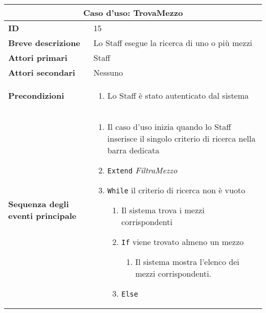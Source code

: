 \documentclass[a4paper]{report}
\begin{document}
\clearpage
\begin{table}[H]
\vspace*{-0cm}
\renewcommand{\arraystretch}{1.9}
\begin{tabular}{|p{3.9cm}|p{9.9cm}|}
\hline
\multicolumn{2}{|c|}{\textbf{Caso d’uso: TrovaMezzo}} \\ \hline
        \textbf{ID} & 15 \\ \hline
        \textbf{Breve descrizione} & Lo Staff esegue la ricerca di uno o più mezzi \\ \hline
	\textbf{Attori primari} & Staff \\ \hline
	\textbf{Attori secondari} & Nessuno \\ \hline
	\textbf{Precondizioni} & \begin{enumerate}[label=\arabic*.,leftmargin=14pt,labelsep=0.5em,topsep=0pt,partopsep=0pt,parsep=0pt,itemsep=0pt]
        \item Lo Staff è stato autenticato dal sistema
    \end{enumerate} \\ \hline
	\textbf{Sequenza degli eventi principale} & 
\begin{enumerate}[leftmargin=14pt,label=\arabic*.,labelsep=0.5em,topsep=0pt,partopsep=0pt,parsep=0pt,itemsep=0pt]
    \item Il caso d’uso inizia quando lo Staff inserisce il singolo criterio di ricerca nella barra dedicata 
    \item \texttt{Extend} \textit{FiltraMezzo}
    \item \texttt{While} il criterio di ricerca non è vuoto
    \begin{enumerate}[label=\arabic{enumi}.\arabic*.,leftmargin=22pt,labelsep=0.5em,topsep=0pt,partopsep=0pt,parsep=0pt,itemsep=0pt]
        \item Il sistema trova i mezzi corrispondenti
        \item \texttt{If} viene trovato almeno un mezzo
        \begin{enumerate}[label=\arabic{enumi}.\arabic{enumii}.\arabic*.,leftmargin=22pt,labelsep=0.5em,topsep=0pt,partopsep=0pt,parsep=0pt,itemsep=0pt]
            \item Il sistema mostra l’elenco dei mezzi corrispondenti.
        \end{enumerate}
        \item \texttt{Else}
        \begin{enumerate}[label=\arabic{enumi}.\arabic{enumii}.\arabic*.,leftmargin=22pt,labelsep=0.5em,topsep=0pt,partopsep=0pt,parsep=0pt,itemsep=0pt]

\end{enumerate}
\end{enumerate}
\end{enumerate}
\end{tabular}
\end{table}
\end{document}
